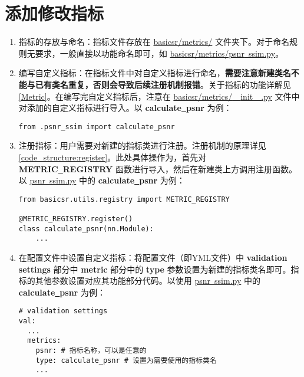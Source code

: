 \documentclass[../main.tex]{subfiles}
\begin{document}
\section{添加修改指标}\label{howto:add_metric}

\begin{enumerate}
	\item 指标的存放与命名：指标文件存放在 \href{https://github.com/XPixelGroup/BasicSR/tree/master/basicsr/metrics}{basicsr/metrics/} 文件夹下。对于命名规则无要求，一般直接以功能命名即可，如 \href{https://github.com/XPixelGroup/BasicSR/tree/master/basicsr/metrics/psnr_ssim.py}{basicsr/metrics/psnr\underline{~}ssim.py}。
	
	\item 编写自定义指标：在指标文件中对自定义指标进行命名，\textbf{需要注意新建类名不能与已有类名重复，否则会导致后续注册机制报错}。关于指标的功能详解见\ref{Metric}。在编写完自定义指标后，注意在 \href{https://github.com/XPixelGroup/BasicSR/tree/master/basicsr/metrics/__init__.py}{basicsr/metrics/\underline{~~}init\underline{~~}.py} 文件中对添加的自定义指标进行导入。以 \textbf{calculate\underline{~}psnr} 为例：
\begin{verbatim}
from .psnr_ssim import calculate_psnr
\end{verbatim}
	
	\item 注册指标：用户需要对新建的指标类进行注册。注册机制的原理详见\ref{code_structure:register}。此处具体操作为，首先对 \textbf{METRIC\underline{~}REGISTRY} 函数进行导入，然后在新建类上方调用注册函数。以 \href{https://github.com/XPixelGroup/BasicSR/tree/master/basicsr/metrics/psnr_ssim.py}{psnr\underline{~}ssim.py} 中的 \textbf{calculate\underline{~}psnr} 为例：
\begin{verbatim}
from basicsr.utils.registry import METRIC_REGISTRY

@METRIC_REGISTRY.register()
class calculate_psnr(nn.Module):
    ...
\end{verbatim}
	
	\item 在配置文件中设置自定义指标：将配置文件（即YML文件）中 \textbf{validation settings} 部分中 \textbf{metric} 部分中的  \textbf{type} 参数设置为新建的指标类名即可。指标的其他参数设置对应其功能部分代码。以使用 \href{https://github.com/XPixelGroup/BasicSR/tree/master/basicsr/metrics/psnr_ssim.py}{psnr\underline{~}ssim.py} 中的 \textbf{calculate\underline{~}psnr} 为例：
\begin{verbatim}
# validation settings
val:
  ...
  metrics:
    psnr: # 指标名称，可以是任意的
    type: calculate_psnr # 设置为需要使用的指标类名
    ...
\end{verbatim}
\end{enumerate}
\end{document}

